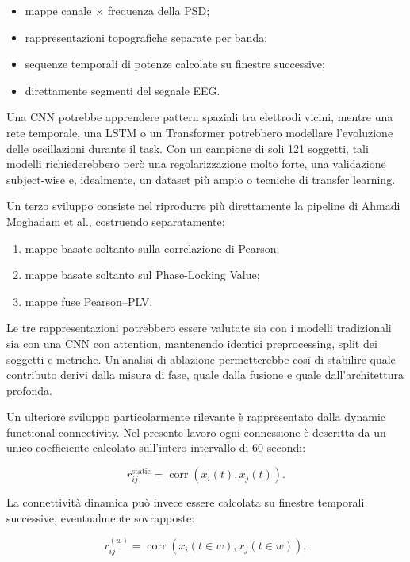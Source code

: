 \begin{itemize}
	\item mappe canale $\times$ frequenza della PSD;
	\item rappresentazioni topografiche separate per banda;
	\item sequenze temporali di potenze calcolate su finestre
	successive;
	\item direttamente segmenti del segnale EEG.
\end{itemize}

Una CNN potrebbe apprendere pattern spaziali tra elettrodi vicini,
mentre una rete temporale, una LSTM o un Transformer potrebbero
modellare l'evoluzione delle oscillazioni durante il task. Con un
campione di soli 121 soggetti, tali modelli richiederebbero però una
regolarizzazione molto forte, una validazione subject-wise e,
idealmente, un dataset più ampio o tecniche di transfer learning.

Un terzo sviluppo consiste nel riprodurre più direttamente la
pipeline di Ahmadi Moghadam et al., costruendo separatamente:

\begin{enumerate}
	\item mappe basate soltanto sulla correlazione di Pearson;
	\item mappe basate soltanto sul Phase-Locking Value;
	\item mappe fuse Pearson--PLV.
\end{enumerate}

Le tre rappresentazioni potrebbero essere valutate sia con i modelli
tradizionali sia con una CNN con attention, mantenendo identici
preprocessing, split dei soggetti e metriche. Un'analisi di ablazione
permetterebbe così di stabilire quale contributo derivi dalla misura
di fase, quale dalla fusione e quale dall'architettura profonda.

Un ulteriore sviluppo particolarmente rilevante è rappresentato dalla
dynamic functional connectivity. Nel presente lavoro ogni
connessione è descritta da un unico coefficiente calcolato sull'intero
intervallo di 60 secondi:

\begin{equation}
	r_{ij}^{\mathrm{static}}
	=
	\operatorname{corr}
	\left(x_i(t),x_j(t)\right).
\end{equation}

La connettività dinamica può invece essere calcolata su finestre
temporali successive, eventualmente sovrapposte:

\begin{equation}
	r_{ij}^{(w)}
	=
	\operatorname{corr}
	\left(
	x_i(t\in w),
	x_j(t\in w)
	\right),
\end{equation}

